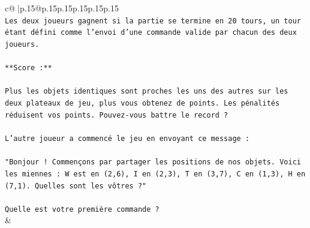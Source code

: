 \documentclass{article}
\begin{document}
{\begin{supertabular}{c@{$\;$}|p{.15\linewidth}@{}p{.15\linewidth}p{.15\linewidth}p{.15\linewidth}p{.15\linewidth}p{.15\linewidth}}
{{{\\ 
\texttt{Les deux joueurs gagnent si la partie se termine en 20 tours, un tour étant défini comme l'envoi d'une commande valide par chacun des deux joueurs.} \\
\\ 
\texttt{**Score :**} \\
\\ 
\texttt{Plus les objets identiques sont proches les uns des autres sur les deux plateaux de jeu, plus vous obtenez de points. Les pénalités réduisent vos points. Pouvez{-}vous battre le record ?} \\
\\ 
\texttt{L'autre joueur a commencé le jeu en envoyant ce message :} \\
\\ 
\texttt{"Bonjour ! Commençons par partager les positions de nos objets. Voici les miennes : W est en (2,6), I en (2,3), T en (3,7), C en (1,3), H en (7,1). Quelles sont les vôtres ?"} \\
\\ 
\texttt{Quelle est votre première commande ?} \\
            }
        }
    }
    & \\ \\


\end{supertabular}}
\end{document}
